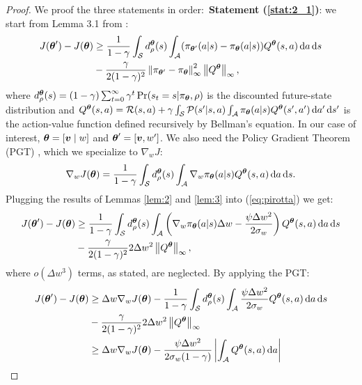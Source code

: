 \safesigma*
\begin{proof}
We proof the three statements in order:\hfill\,\linebreak
\textbf{Statement (\ref{stat:2_1})}: we start from Lemma 3.1 from \cite{adaptive_step}:
\begin{align}
J(\vtheta')-J(\vtheta) &\geq \frac{1}{1-\gamma}\int_{\Sspace}d_{\rho}^{\vtheta}(s)\int_{\Aspace}(\pi_{\vtheta'}(a\vert s) - \pi_{\vtheta}(a\vert s))Q^{\vtheta}(s,a)\de a \de s \nonumber\\
&- \frac{\gamma}{2(1-\gamma)^2}\norm[\infty]{\pi_{\vtheta'} - \pi_{\vtheta}}^2\norm[\infty]{Q^{\vtheta}},\label{eq:pirotta}
\end{align}
where $d_{\rho}^{\vtheta}(s) = (1-\gamma)\sum_{t=0}^{\infty}\gamma^t\Pr(s_t=s\vert\pi_{\vtheta},\rho)$ is the discounted future-state distribution and $Q^{\vtheta}(s,a) = \Reward(s,a)+\gamma\int_{\Sspace}\Transition(s'\vert s,a)\int_{\Aspace}\pi_{\vtheta}(a\vert s)Q^{\vtheta}(s',a')\de a' \de s'$ is the action-value function defined recursively by Bellman's equation. In our case of interest, $\vtheta = [\vv\mid w]$ and $\vtheta' = [\vv,w']$.
We also need the Policy Gradient Theorem (PGT) \cite{Sutton:1999:PGM:3009657.3009806}, which we specialize to $\nabla_w J$:
\[
	\gradJ[w]{\vtheta} = \frac{1}{1-\gamma}\int_{\Sspace}d_{\rho}^{\vtheta}(s)
	\int_{\Aspace}\nabla_w\pi_{\vtheta}(a\vert s)Q^{\vtheta}(s,a)\de a \de s.
\] 
Plugging the results of Lemmas \ref{lem:2} and \ref{lem:3} into (\ref{eq:pirotta}) we get:
\begin{align}
J(\vtheta') - J(\vtheta) &\geq \frac{1}{1-\gamma}\int_{\Sspace}d_{\rho}^{\vtheta}(s)
\int_{\Aspace}\left(\nabla_w \policy \Delta w - \frac{\psi\Delta w^2}{2\sigma_w}\right)
Q^{\vtheta}(s,a)\de a \de s \nonumber\\
&- \frac{\gamma}{2(1-\gamma)^2}
2\Delta w^2
\norm[\infty]{Q^{\vtheta}},\label{eq:4_2_1}
\end{align}
where $o(\Delta w^3)$ terms, as stated, are neglected. By applying the PGT:
\begin{align*}
J(\vtheta') - J(\vtheta) &\geq 
 \Delta w\gradJ[w]{\vtheta} - 
\frac{1}{1-\gamma}\int_{\Sspace}d_{\rho}^{\vtheta}(s)
\int_{\Aspace}\frac{\psi\Delta w^2}{2\sigma_w}
Q^{\vtheta}(s,a)\de a \de s \\
&- \frac{\gamma}{2(1-\gamma)^2}
2\Delta w^2
\norm[\infty]{Q^{\vtheta}} \\
%
&\geq \Delta w\gradJ[w]{\vtheta} - 
\frac{\psi\Delta w^2}{2\sigma_w(1-\gamma)}
\left|\int_{\Aspace}
Q^{\vtheta}(s,a)\de a\right| \\

\end{align*}
\end{proof}
